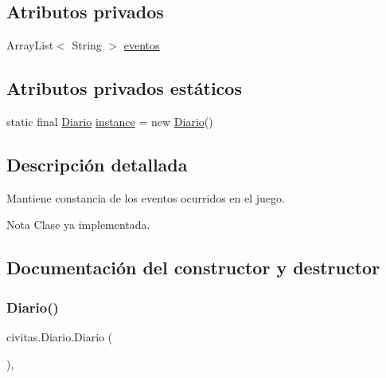 \subsection*{Atributos privados}
\begin{DoxyCompactItemize}
\item 
Array\+List$<$ String $>$ \hyperlink{classcivitas_1_1Diario_a38a6db28bf50dbcaac2bf60db2afcfd7}{eventos}
\end{DoxyCompactItemize}
\subsection*{Atributos privados estáticos}
\begin{DoxyCompactItemize}
\item 
static final \hyperlink{classcivitas_1_1Diario}{Diario} \hyperlink{classcivitas_1_1Diario_ae37b0fcc0069768cbc49cf6aedeaffff}{instance} = new \hyperlink{classcivitas_1_1Diario}{Diario}()
\end{DoxyCompactItemize}


\subsection{Descripción detallada}
Mantiene constancia de los eventos ocurridos en el juego. 

\begin{DoxyNote}{Nota}
Clase ya implementada. 
\end{DoxyNote}


\subsection{Documentación del constructor y destructor}
\mbox{\label{classcivitas_1_1Diario_aa1dad77c65d0c353a8f17353ea5f10aa}} 
\subsubsection{\texorpdfstring{Diario()}{Diario()}}
{\footnotesize\ttfamily civitas.\+Diario.\+Diario (\begin{DoxyParamCaption}{ }\end{DoxyParamCaption})\hspace{0.3cm}{\ttfamily [inline]}, {\ttfamily [private]}}



